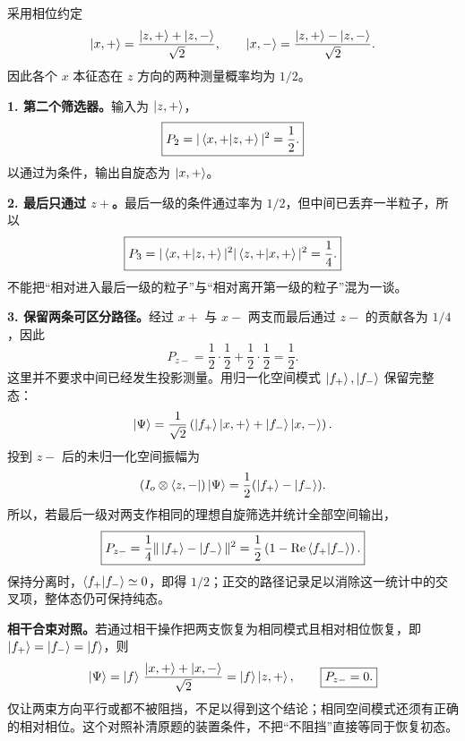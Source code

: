 \begin{checkedsolution}
采用相位约定
\begin{equation}
  \left|x,+\right\rangle=\frac{\left|z,+\right\rangle+\left|z,-\right\rangle}{\sqrt2},\qquad
  \left|x,-\right\rangle=\frac{\left|z,+\right\rangle-\left|z,-\right\rangle}{\sqrt2}.
\end{equation}
因此各个 $x$ 本征态在 $z$ 方向的两种测量概率均为 $1/2$。

\textbf{1. 第二个筛选器。}输入为 $\left|z,+\right\rangle$，
\begin{equation}
  \boxed{P_2=|\left\langle x,+ \middle| z,+ \right\rangle|^2=\frac12.}
\end{equation}
以通过为条件，输出自旋态为 $\left|x,+\right\rangle$。

\textbf{2. 最后只通过 $z+$。}最后一级的条件通过率为 $1/2$，但中间已丢弃一半粒子，所以
\begin{equation}
  \boxed{P_3=|\left\langle x,+ \middle| z,+ \right\rangle|^2
    |\left\langle z,+ \middle| x,+ \right\rangle|^2=\frac14.}
\end{equation}
不能把“相对进入最后一级的粒子”与“相对离开第一级的粒子”混为一谈。

\textbf{3. 保留两条可区分路径。}经过 $x+$ 与 $x-$ 两支而最后通过 $z-$ 的贡献各为 $1/4$，因此
\begin{equation}
  \boxed{P_{z-}=\frac12\cdot\frac12+\frac12\cdot\frac12=\frac12.}
\end{equation}
这里并不要求中间已经发生投影测量。用归一化空间模式 $\left|f_+\right\rangle,\left|f_-\right\rangle$ 保留完整态：
\begin{equation}
  \left|\Psi\right\rangle=\frac1{\sqrt2}
    \left(\left|f_+\right\rangle\left|x,+\right\rangle+\left|f_-\right\rangle\left|x,-\right\rangle\right).
\end{equation}
投到 $z-$ 后的未归一化空间振幅为
\begin{equation}
  (I_o\otimes\left\langle z,-\right|)\left|\Psi\right\rangle
    =\frac12(\left|f_+\right\rangle-\left|f_-\right\rangle).
\end{equation}
所以，若最后一级对两支作相同的理想自旋筛选并统计全部空间输出，
\begin{equation}
  \boxed{P_{z-}=\frac14\|\left|f_+\right\rangle-\left|f_-\right\rangle\|^2
    =\frac12\left(1-\operatorname{Re}\left\langle f_+ \middle| f_- \right\rangle\right).}
\end{equation}
保持分离时，$\left\langle f_+ \middle| f_- \right\rangle\simeq0$，即得 $1/2$；正交的路径记录足以消除这一统计中的交叉项，整体态仍可保持纯态。

\textbf{相干合束对照。}若通过相干操作把两支恢复为相同模式且相对相位恢复，即 $\left|f_+\right\rangle=\left|f_-\right\rangle=\left|f\right\rangle$，则
\begin{equation}
  \left|\Psi\right\rangle=\left|f\right\rangle\,\frac{\left|x,+\right\rangle+\left|x,-\right\rangle}{\sqrt2}
    =\left|f\right\rangle\left|z,+\right\rangle,\qquad \boxed{P_{z-}=0.}
\end{equation}
仅让两束方向平行或都不被阻挡，不足以得到这个结论；相同空间模式还须有正确的相对相位。这个对照补清原题的装置条件，不把“不阻挡”直接等同于恢复初态。
\end{checkedsolution}
